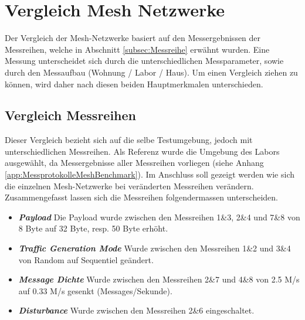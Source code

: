 \clearpage

\section{Vergleich Mesh Netzwerke}\label{sec:VergleichMeshNetzwerke}




Der Vergleich der Mesh-Netzwerke basiert auf den Messergebnissen der Messreihen, welche in Abschnitt \ref{subsec:Messreihe} erwähnt wurden. Eine Messung unterscheidet sich durch die unterschiedlichen Messparameter, sowie durch den Messaufbau (Wohnung / Labor / Haus). Um einen Vergleich ziehen zu können, wird daher nach diesen beiden Hauptmerkmalen unterschieden.

\subsection{Vergleich Messreihen}\label{subsec:VergleichMessreihen}

Dieser Vergleich bezieht sich auf die selbe Testumgebung, jedoch mit unterschiedlichen Messreihen. Als Referenz wurde die Umgebung des Labors ausgewählt, da Messergebnisse aller Messreihen vorliegen (siehe Anhang \ref{app:MessprotokolleMeshBenchmark}). Im Anschluss soll gezeigt werden wie sich die einzelnen Mesh-Netzwerke bei veränderten Messreihen verändern. \\

Zusammengefasst lassen sich die Messreihen folgendermassen unterscheiden. 

\begin{itemize}
	\item \textbf{\textit{Payload}} Die Payload wurde zwischen den Messreihen 1\&3, 2\&4 und 7\&8 von 8 Byte auf 32 Byte, resp. 50 Byte erhöht.
	\item \textbf{\textit{Traffic Generation Mode}} Wurde zwischen den Messreihen 1\&2 und 3\&4 von Random auf Sequentiel geändert.
	\item \textbf{\textit{Message Dichte}} Wurde zwischen den Messreihen 2\&7 und 4\&8 von 2.5 M/s auf 0.33 M/s gesenkt (Messages/Sekunde).
	\item \textbf{\textit{Disturbance}} Wurde zwischen den Messreihen 2\&6 eingeschaltet.
\end{itemize}

